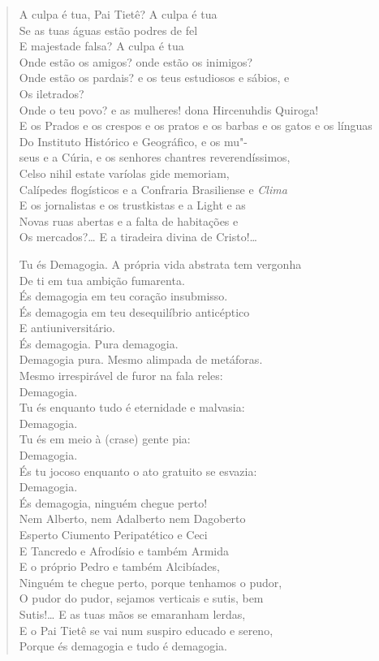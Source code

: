 \begin{verse}
A culpa é tua, Pai Tietê? A culpa é tua\\
Se as tuas águas estão podres de fel\\
E majestade falsa? A culpa é tua\\
Onde estão os amigos? onde estão os inimigos?\\
Onde estão os pardais? e os teus estudiosos e sábios, e\\
Os iletrados?\\
Onde o teu povo? e as mulheres! dona Hircenuhdis Quiroga!\\
E os Prados e os crespos e os pratos e os barbas e os gatos e os línguas\\
Do Instituto Histórico e Geográfico, e os mu"-\\
seus e a Cúria, e os senhores chantres reverendíssimos,\\
Celso nihil estate varíolas gide memoriam,\\
Calípedes flogísticos e a Confraria Brasiliense e \emph{Clima}\\
E os jornalistas e os trustkistas e a Light e as\\
Novas ruas abertas e a falta de habitações e\\
Os mercados?\ldots{} E a tiradeira divina de Cristo!\ldots{}

Tu és Demagogia. A própria vida abstrata tem vergonha\\
De ti em tua ambição fumarenta.\\
És demagogia em teu coração insubmisso.\\
És demagogia em teu desequilíbrio anticéptico\\
E antiuniversitário.\\
És demagogia. Pura demagogia.\\
Demagogia pura. Mesmo alimpada de metáforas.\\
Mesmo irrespirável de furor na fala reles:\\
Demagogia.\\
Tu és enquanto tudo é eternidade e malvasia:\\
Demagogia.\\
Tu és em meio à (crase) gente pia:\\
Demagogia.\\
És tu jocoso enquanto o ato gratuito se esvazia:\\
Demagogia.\\
És demagogia, ninguém chegue perto!\\
Nem Alberto, nem Adalberto nem Dagoberto\\
Esperto Ciumento Peripatético e Ceci\\
E Tancredo e Afrodísio e também Armida\\
E o próprio Pedro e também Alcibíades,\\
Ninguém te chegue perto, porque tenhamos o pudor,\\
O pudor do pudor, sejamos verticais e sutis, bem\\
Sutis!\ldots{} E as tuas mãos se emaranham lerdas,\\
E o Pai Tietê se vai num suspiro educado e sereno,\\
Porque és demagogia e tudo é demagogia.


\end{verse}
